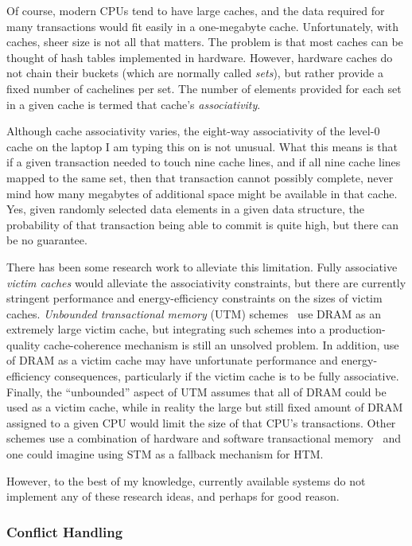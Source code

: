 Of course, modern CPUs tend to have large caches, and the data required
for many transactions would fit easily in a one-megabyte cache.
Unfortunately, with caches, sheer size is not all that matters.
The problem is that most caches
can be thought of hash tables implemented in hardware.
However, hardware caches do not chain their buckets (which are normally
called \emph{sets}), but rather
provide a fixed number of cachelines per set.
The number of elements provided for each set in a given cache
is termed that cache's \emph{associativity}.

Although cache associativity varies, the eight-way associativity of
the level-0 cache on the laptop I am typing this on is not unusual.
What this means is that if a given transaction needed to touch
nine cache lines, and if all nine cache lines mapped to the same
set, then that transaction cannot possibly complete, never mind how
many megabytes of additional space might be available in that cache.
Yes, given randomly selected data elements in a given data structure,
the probability of that transaction being able to commit is quite
high, but there can be no guarantee.

There has been some research work to alleviate this limitation.
Fully associative \emph{victim caches} would alleviate the associativity
constraints, but there are currently stringent performance and
energy-efficiency constraints on the sizes of victim caches.
\emph{Unbounded transactional memory} (UTM)
schemes~\cite{CScottAnanian2006,KevinEMoore2006}
use DRAM as an extremely large victim cache, but integrating such schemes
into a production-quality cache-coherence mechanism is still an unsolved
problem.
In addition, use of DRAM as a victim cache may have unfortunate
performance and energy-efficiency consequences, particularly
if the victim cache is to be fully associative.
Finally, the ``unbounded'' aspect of UTM assumes that all of DRAM
could be used as a victim cache, while in reality
the large but still fixed amount of DRAM assigned to a given CPU
would limit the size of that CPU's transactions.
Other schemes use a combination of hardware and software transactional
memory~\cite{SanjeevKumar2006} and one could imagine using STM as a
fallback mechanism for HTM.

However, to the best of my knowledge, currently available systems do
not implement any of these research ideas, and perhaps for good reason.

\subsubsection{Conflict Handling}
\label{sec:future:Conflict Handling}

